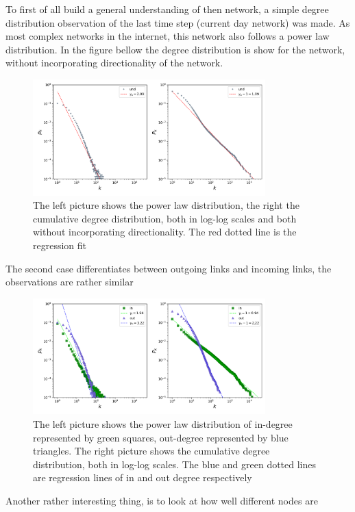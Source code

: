 \documentclass[a4paper]{article}
\begin{document}
To first of all build a general understanding of then network, a simple
degree distribution observation of the last time step (current day network)
was made. As most complex networks in the internet, this network also follows
a power law distribution. In the figure bellow the degree distribution is
show for the network, without incorporating directionality of the network.
\begin{figure}[H]
    \centering
    \includegraphics[width=0.8\textwidth]{../pres/pics/dist_u.png}
    \caption{The left picture shows the power law distribution, the right
    the cumulative degree distribution, both in log-log scales and both
    without incorporating directionality. The red dotted line is the regression fit}
    \label{dist_u}
\end{figure}
The second case differentiates between outgoing links and incoming links,
the observations are rather similar
\begin{figure}[H]
    \centering
    \includegraphics[width=0.8\textwidth]{../pres/pics/dist_d.png}
    \caption{The left picture shows the power law distribution of in-degree
        represented by green squares, out-degree represented by blue
        triangles. The right picture shows the cumulative degree
        distribution, both in log-log scales. The blue and green dotted lines are
        regression lines of in and out degree respectively}
    \label{dist_u}
\end{figure}
Another rather interesting thing, is to look at how well different nodes are
\end{document}
